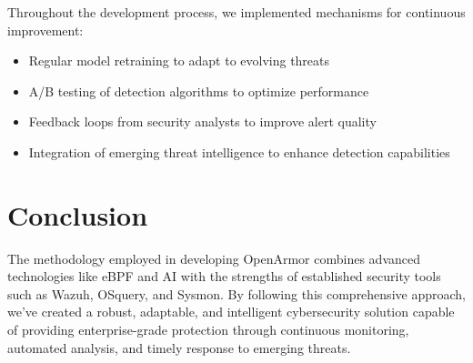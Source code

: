 Throughout the development process, we implemented mechanisms for continuous improvement:
\begin{itemize}
    \item Regular model retraining to adapt to evolving threats
    \item A/B testing of detection algorithms to optimize performance
    \item Feedback loops from security analysts to improve alert quality
    \item Integration of emerging threat intelligence to enhance detection capabilities
\end{itemize}

\section{Conclusion}

The methodology employed in developing OpenArmor combines advanced technologies like eBPF and AI with the strengths of established security tools such as Wazuh, OSquery, and Sysmon. By following this comprehensive approach, we've created a robust, adaptable, and intelligent cybersecurity solution capable of providing enterprise-grade protection through continuous monitoring, automated analysis, and timely response to emerging threats.